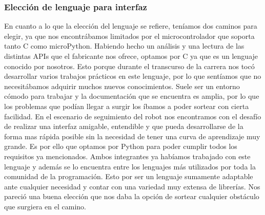 \subsubsection{Elección de lenguaje para interfaz}

En cuanto a lo que la elección del lenguaje se refiere, teníamos dos caminos para elegir, ya que nos encontrábamos limitados por el microcontrolador que soporta tanto C como microPython. Habiendo hecho un análisis y una lectura de las distintas APIs que el fabricante nos ofrece, optamos por C ya que es un lenguaje conocido por nosotros. Esto porque durante el transcurso de la carrera nos tocó desarrollar varios trabajos prácticos en este lenguaje, por lo que sentíamos que no necesitábamos adquirir muchos nuevos conocimientos. Suele ser un entorno cómodo para trabajar y la documentación que se encuentra es amplia, por lo que los problemas que podían llegar a surgir los íbamos a poder sortear con cierta facilidad.
En el escenario de seguimiento del robot nos encontramos con el desafío de realizar una interfaz amigable, entendible y que pueda desarrollarse de la forma mas rápida posible sin la necesidad de tener una curva de aprendizaje muy grande. Es por ello que optamos por Python para poder cumplir todos los requisitos ya mencionados. Ambos integrantes ya habíamos trabajado con este lenguaje y además se lo encuentra entre los lenguajes más utilizados por toda la comunidad de la programación. Esto por ser un lenguaje sumamente adaptable ante cualquier necesidad y contar con una variedad muy extensa de librerías. Nos pareció una buena elección que nos daba la opción de sortear cualquier obstáculo que surgiera en el camino.